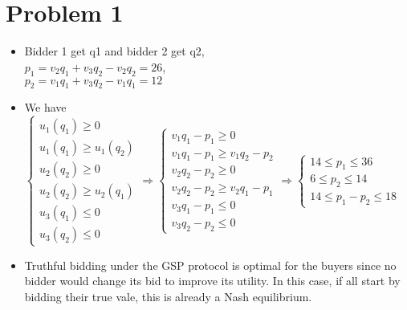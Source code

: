 \documentclass{article}
\newenvironment{answer}{\par\color{ForestGreen}}{\par}
\begin{document}
\section{Problem 1}
\begin{answer}
  \begin{itemize}
    \item Bidder 1 get q1 and bidder 2 get q2, \\
    $p_1 = v_2q_1 + v_3q_2 - v_2q_2 = 26$, \\
    $p_2 = v_1q_1 + v_3q_2 - v_1q_1 = 12$
    \item We have
    $\begin{cases}
      u_1(q_1) \geq 0 \\
      u_1(q_1) \geq u_1(q_2) \\
      u_2(q_2) \geq 0 \\
      u_2(q_2) \geq u_2(q_1) \\
      u_3(q_1) \leq 0 \\
      u_3(q_2) \leq 0
    \end{cases}
    \Rightarrow
    \begin{cases}
      v_1q_1 - p_1 \geq 0 \\
      v_1q_1 - p_1 \geq v_1q_2 - p_2 \\
      v_2q_2 - p_2 \geq 0 \\
      v_2q_2 - p_2 \geq v_2q_1 - p_1 \\
      v_3q_1 - p_1 \leq 0 \\
      v_3q_2 - p_2 \leq 0
    \end{cases}
    \Rightarrow
    \begin{cases}
      14 \leq  p_1 \leq 36 \\
      6 \leq  p_2 \leq 14 \\
      14 \leq  p_1 - p_2 \leq 18
    \end{cases}$
    \item Truthful bidding under the GSP protocol is optimal for the buyers since no bidder would change its bid to improve its utility.
    In this case, if all start by bidding their true vale, this is already a Nash equilibrium.
  \end{itemize}
\end{answer}
\end{document}
